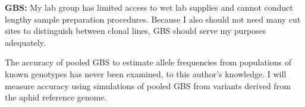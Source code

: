 \textbf{GBS:}
My lab group has limited access to wet lab supplies and cannot conduct lengthy sample
preparation procedures.
Because I also should not need many cut sites to distinguish between clonal lines, GBS
should serve my purposes adequately.




The accuracy of pooled GBS to estimate allele frequencies from populations of known
genotypes has never been examined, to this author's knowledge.
I will measure accuracy using simulations of pooled GBS from variants derived from the 
aphid reference genome.








